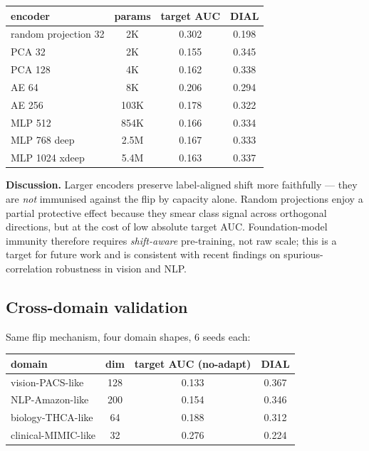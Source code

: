 \documentclass{article}
\begin{document}
\begin{center}
\begin{tabular}{lccc}
\toprule
encoder & params & target AUC & DIAL \\
\midrule
random projection 32   & 2K   & 0.302 & 0.198 \\
PCA 32                 & 2K   & 0.155 & 0.345 \\
PCA 128                & 4K   & 0.162 & 0.338 \\
AE 64                  & 8K   & 0.206 & 0.294 \\
AE 256                 & 103K & 0.178 & 0.322 \\
MLP 512                & 854K & 0.166 & 0.334 \\
MLP 768 deep           & 2.5M & 0.167 & 0.333 \\
MLP 1024 xdeep         & 5.4M & 0.163 & 0.337 \\
\bottomrule
\end{tabular}
\end{center}

\textbf{Discussion.} Larger encoders preserve label-aligned shift more
faithfully — they are \emph{not} immunised against the flip by capacity
alone. Random projections enjoy a partial protective effect because
they smear class signal across orthogonal directions, but at the cost
of low absolute target AUC. Foundation-model immunity therefore
requires \emph{shift-aware} pre-training, not raw scale; this is a
target for future work and is consistent with recent findings on
spurious-correlation robustness in vision and NLP.

\subsection{Cross-domain validation}

Same flip mechanism, four domain shapes, $6$ seeds each:

\begin{center}
\begin{tabular}{lccc}
\toprule
domain & dim & target AUC (no-adapt) & DIAL \\
\midrule
vision-PACS-like    & 128 & 0.133 & 0.367 \\
NLP-Amazon-like     & 200 & 0.154 & 0.346 \\
biology-THCA-like   & 64  & 0.188 & 0.312 \\
clinical-MIMIC-like & 32  & 0.276 & 0.224 \\
\bottomrule
\end{tabular}
\end{center}
\end{document}
